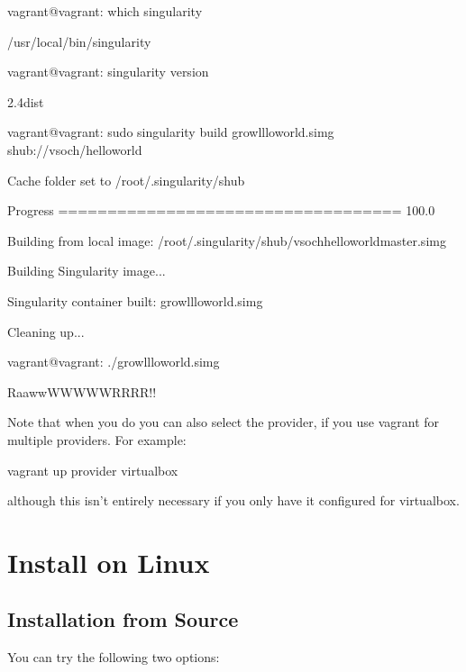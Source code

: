 \documentclass[letterpaper,10pt,english]{sphinxmanual}
\begin{document}
%
\begin{sphinxVerbatim}[commandchars=\\\{\}]
vagrant@vagrant:\PYGZti{}\PYGZdl{} which singularity

/usr/local/bin/singularity

vagrant@vagrant:\PYGZti{}\PYGZdl{} singularity \PYGZhy{}\PYGZhy{}version

2.4\PYGZhy{}dist


vagrant@vagrant:\PYGZti{}\PYGZdl{} sudo singularity build growl\PYGZhy{}llo\PYGZhy{}world.simg shub://vsoch/hello\PYGZhy{}world

Cache folder set to /root/.singularity/shub

Progress \textbar{}===================================\textbar{} 100.0\PYGZpc{}

Building from local image: /root/.singularity/shub/vsoch\PYGZhy{}hello\PYGZhy{}world\PYGZhy{}master.simg

Building Singularity image...

Singularity container built: growl\PYGZhy{}llo\PYGZhy{}world.simg

Cleaning up...

vagrant@vagrant:\PYGZti{}\PYGZdl{} ./growl\PYGZhy{}llo\PYGZhy{}world.simg

RaawwWWWWWRRRR!!
\end{sphinxVerbatim}

Note that when you do  you can also select the provider, if you use vagrant for multiple providers. For example:

%
\begin{sphinxVerbatim}[commandchars=\\\{\}]
vagrant up \PYGZhy{}\PYGZhy{}provider virtualbox
\end{sphinxVerbatim}

although this isn’t entirely necessary if you only have it configured for virtualbox.


\section{Install on Linux}
\label{\detokenize{installation:install-on-linux}}

\subsection{Installation from Source}
\label{\detokenize{installation:installation-from-source}}
You can try the following two options:
\end{document}

